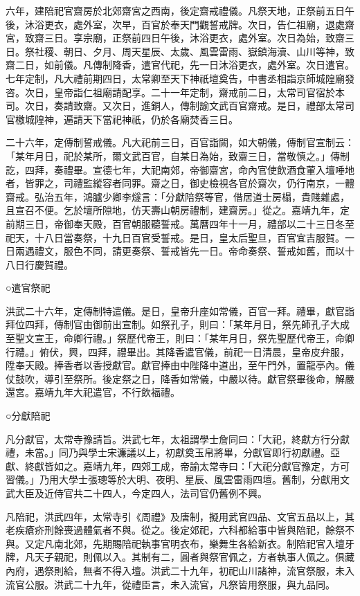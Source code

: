 六年，建陪祀官齋房於北郊齋宮之西南，後定齋戒禮儀。凡祭天地，正祭前五日午後，沐浴更衣，處外室，次早，百官於奉天門觀誓戒牌。次日，告仁祖廟，退處齋宮，致齋三日。享宗廟，正祭前四日午後，沐浴更衣，處外室。次日為始，致齋三日。祭社稷、朝日、夕月、周天星辰、太歲、風雲雷雨、嶽鎮海瀆、山川等神，致齋二日，如前儀。凡傳制降香，遣官代祀，先一日沐浴更衣，處外室。次日遣官。七年定制，凡大禮前期四日，太常卿至天下神祇壇奠告，中書丞相詣京師城隍廟發咨。次日，皇帝詣仁祖廟請配享。二十一年定制，齋戒前二日，太常司官宿於本司。次日，奏請致齋。又次日，進銅人，傳制諭文武百官齋戒。是日，禮部太常司官檄城隍神，遍請天下當祀神祇，仍於各廟焚香三日。

二十六年，定傳制誓戒儀。凡大祀前三日，百官詣闕，如大朝儀，傳制官宣制云：「某年月日，祀於某所，爾文武百官，自某日為始，致齋三日，當敬慎之。」傳制訖，四拜，奏禮畢。宣德七年，大祀南郊，帝御齋宮，命內官使飲酒食葷入壇唾地者，皆罪之，司禮監縱容者同罪。齋之日，御史檢視各官於齋次，仍行南京，一體齋戒。弘治五年，鴻臚少卿李燧言：「分獻陪祭等官，借居道士房榻，貴賤雜處，且宣召不便。乞於壇所隙地，仿天壽山朝房禮制，建齋房。」從之。嘉靖九年，定前期三日，帝御奉天殿，百官朝服聽誓戒。萬曆四年十一月，禮部以二十三日冬至祀天，十八日當奏祭，十九日百官受誓戒。是日，皇太后聖旦，百官宜吉服賀。一日兩遇禮文，服色不同，請更奏祭、誓戒皆先一日。帝命奏祭、誓戒如舊，而以十八日行慶賀禮。

○遣官祭祀

洪武二十六年，定傳制特遣儀。是日，皇帝升座如常儀，百官一拜。禮畢，獻官詣拜位四拜，傳制官由御前出宣制。如祭孔子，則曰：「某年月日，祭先師孔子大成至聖文宣王，命卿行禮。」祭歷代帝王，則曰：「某年月日，祭先聖歷代帝王，命卿行禮。」俯伏，興，四拜，禮畢出。其降香遣官儀，前祀一日清晨，皇帝皮弁服，陞奉天殿。捧香者以香授獻官。獻官捧由中陛降中道出，至午門外，置龍亭內。儀仗鼓吹，導引至祭所。後定祭之日，降香如常儀，中嚴以待。獻官祭畢後命，解嚴還宮。嘉靖九年大祀遣官，不行飲福禮。

○分獻陪祀

凡分獻官，太常寺豫請旨。洪武七年，太祖謂學士詹同曰：「大祀，終獻方行分獻禮，未當。」同乃與學士宋濂議以上，初獻奠玉帛將畢，分獻官即行初獻禮。亞獻、終獻皆如之。嘉靖九年，四郊工成，帝諭太常寺曰：「大祀分獻官豫定，方可習儀。」乃用大學士張璁等於大明、夜明、星辰、風雲雷雨四壇。舊制，分獻用文武大臣及近侍官共二十四人，今定四人，法司官仍舊例不興。

凡陪祀，洪武四年，太常寺引《周禮》及唐制，擬用武官四品、文官五品以上，其老疾瘡疥刑餘喪過體氣者不與。從之。後定郊祀，六科都給事中皆與陪祀，餘祭不與。又定凡南北郊，先期賜陪祀執事官明衣布，樂舞生各給新衣。制陪祀官入壇牙牌，凡天子親祀，則佩以入。其制有二，圓者與祭官佩之，方者執事人佩之。俱藏內府，遇祭則給，無者不得入壇。洪武二十九年，初祀山川諸神，流官祭服，未入流官公服。洪武二十九年，從禮臣言，未入流官，凡祭皆用祭服，與九品同。

